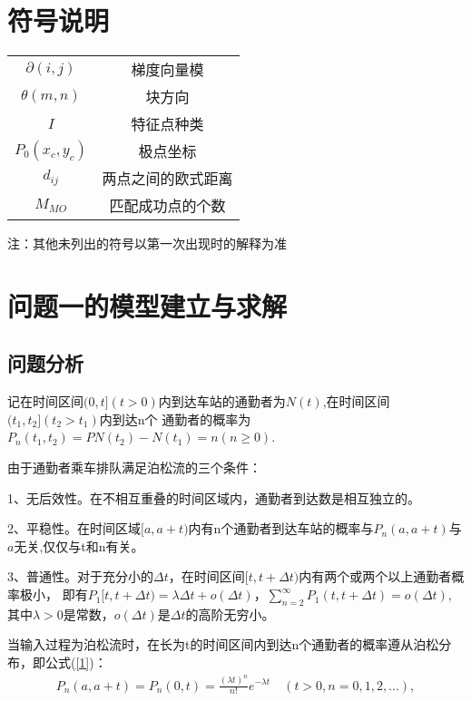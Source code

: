 \documentclass{whutmod}
\begin{document}
\begin{spacing}{1.2}
\section{符号说明}
\begin{center}
	\begin{tabular}{cc}
		\\\toprule[1.5pt]
		\makebox[0.3\textwidth][c]{符号}	&  \makebox[0.4\textwidth][c]{意义} \\ \hline
		$\partial(i,j)$	    & 梯度向量模 \\ 
		$\theta (m,n)$	    & 块方向  \\ 
		$I$           & 特征点种类  \\ 
		$P_0(x_c,y_c)$   & 极点坐标 \\ 
		$d_{ij}$ & 两点之间的欧式距离 \\ 
		$M_{MO}$   &  匹配成功点的个数 \\ 
		\bottomrule[1.5pt]
	\end{tabular}
\end{center}
注：其他未列出的符号以第一次出现时的解释为准

\clearpage



\section{问题一的模型建立与求解}


\subsection{问题分析}
记在时间区间$(0,t](t>0)$内到达车站的通勤者为$N(t)$,在时间区间$(t_1,t_2](t_2>t_1)$内到达n个
通勤者的概率为$P_n(t_1,t_2)=P{N(t_2)-N(t_1)=n}(n\ge 0)$.

由于通勤者乘车排队满足泊松流的三个条件：

1、无后效性。在不相互重叠的时间区域内，通勤者到达数是相互独立的。

2、平稳性。在时间区域$[a,a+t)$内有n个通勤者到达车站的概率与$P_n(a,a+t)$与$a$无关,仅仅与t和n有关。

3、普通性。对于充分小的$\Delta t$，在时间区间$[t,t+\Delta t)$内有两个或两个以上通勤者概率极小，
即有$P_1[t,t+\Delta t)=\lambda \Delta t +o(\Delta t)$，$\sum_{n=2}^{\infty}P_1(t,t+\Delta t)=o(\Delta t)$,
其中$\lambda >0$是常数，$o(\Delta t)$是$\Delta t$的高阶无穷小。

当输入过程为泊松流时，在长为t的时间区间内到达n个通勤者的概率遵从泊松分布，即公式(\ref{1})：
\begin{equation}
	\label{1}
	\begin{split}
		P_n(a,a+t)=P_n(0,t)=\frac{(\lambda t)^n}{n!}e^{-\lambda t} \quad (t>0,n=0,1,2,...),
	\end{split}
\end{equation}


\end{spacing}
\end{document}
